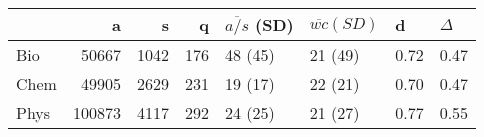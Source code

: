 \begin{tabular}{lrrrllll}
\toprule
{} &       a &      s &    q & $\overline{a/s}$ (SD) & $\overline{wc} (SD)$ & d 
& 
$\Delta$ \\
\midrule
Bio    &   50667 &  1042 &  176 &   48 (45) &  21 (49) &       0.72 &   0.47 \\
Chem  &   49905 &  2629 &  231 &   19 (17) &  22 (21) &       0.70 &   0.47 \\
Phys    &  100873 &  4117 &  292 &   24 (25) &  21 (27) &       0.77 &   0.55 \\

\bottomrule
\end{tabular}
